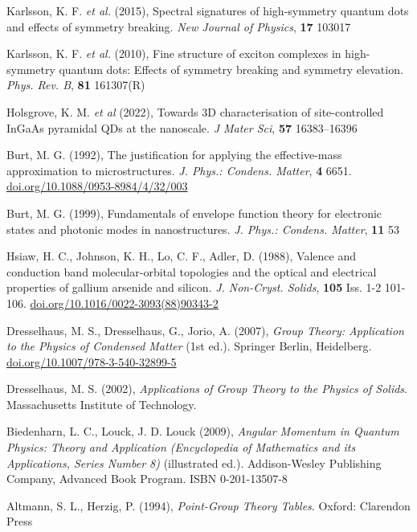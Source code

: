 \documentclass[12pt]{article}
\begin{document}
\begin{thebibliography}{10}

Karlsson, K. F. \textit{et al.} (2015), Spectral signatures of high-symmetry quantum dots and effects of symmetry breaking. \textit{New Journal of Physics}, \textbf{17} 103017

Karlsson, K. F. \textit{et al.} (2010), Fine structure of exciton complexes in high-symmetry quantum dots: Effects of symmetry breaking and symmetry elevation. \textit{Phys. Rev. B}, \textbf{81} 161307(R)

Holsgrove, K. M. \textit{et al} (2022), Towards 3D characterisation of site-controlled InGaAs pyramidal QDs at the nanoscale. \textit{J Mater Sci}, \textbf{57} 16383--16396

Burt, M. G. (1992), The justification for applying the effective-mass approximation to microstructures. \textit{J. Phys.: Condens. Matter}, \textbf{4} 6651. \href{https://doi.org/10.1088/0953-8984/4/32/003}{doi.org/10.1088/0953-8984/4/32/003}

Burt, M. G. (1999), Fundamentals of envelope function theory for electronic states and photonic modes in nanostructures. \textit{J. Phys.: Condens. Matter}, \textbf{11} 53

Hsiaw, H. C., Johnson, K. H., Lo, C. F., Adler, D. (1988), Valence and conduction band molecular-orbital topologies and the optical and electrical properties of gallium arsenide and silicon. \textit{J. Non-Cryst. Solids}, \textbf{105} Iss. 1-2 101-106. \href{https://doi.org/10.1016/0022-3093(88)90343-2}{doi.org/10.1016/0022-3093(88)90343-2}

Dresselhaus, M. S., Dresselhaus, G., Jorio, A. (2007), \textit{Group Theory: Application to the Physics of Condensed Matter} (1st ed.). Springer Berlin, Heidelberg. \href{https://doi.org/10.1007/978-3-540-32899-5}{doi.org/10.1007/978-3-540-32899-5}

Dresselhaus, M. S. (2002), \textit{Applications of Group Theory to the Physics of Solids}. Massachusetts Institute of Technology.

Biedenharn, L. C., Louck, J. D. Louck (2009), \textit{Angular Momentum in Quantum Physics: Theory and Application (Encyclopedia of Mathematics and its Applications, Series Number 8)} (illustrated ed.). Addison-Wesley Publishing Company, Advanced Book Program. ISBN 0-201-13507-8

Altmann, S. L., Herzig, P. (1994), \textit{Point-Group Theory Tables}. Oxford: Clarendon Press

\end{thebibliography}



%





\end{document}
